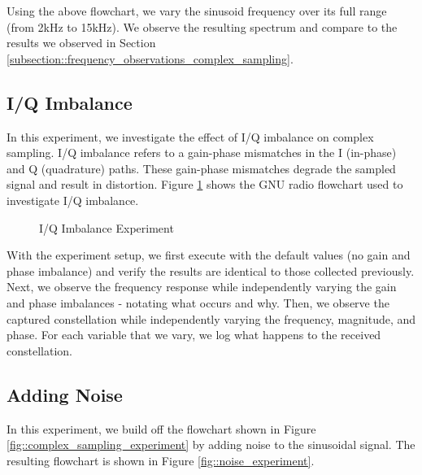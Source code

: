 \documentclass{article}
\begin{document}
Using the above flowchart, we vary the sinusoid frequency over its full range (from 2kHz to 15kHz). We observe the resulting spectrum and compare to the results we observed in Section \ref{subsection::frequency_observations_complex_sampling}.

\subsection{I/Q Imbalance}

In this experiment, we investigate the effect of I/Q imbalance on complex sampling. I/Q imbalance refers to a gain-phase mismatches in the I (in-phase) and Q (quadrature) paths. These gain-phase mismatches degrade the sampled signal and result in distortion. Figure \ref{fig::iq_imbalance_experiment} shows the GNU radio flowchart used to investigate I/Q imbalance.

\begin{figure}[H]
	\centerline{}
	\caption{I/Q Imbalance Experiment}
	\label{fig::iq_imbalance_experiment}
\end{figure}

With the experiment setup, we first execute with the default values (no gain and phase imbalance) and verify the results are identical to those collected previously. Next, we observe the frequency response while independently varying the gain and phase imbalances - notating what occurs and why. Then, we observe the captured constellation while independently varying the frequency, magnitude, and phase. For each variable that we vary, we log what happens to the received constellation.  

\subsection{Adding Noise}

In this experiment, we build off the flowchart shown in Figure \ref{fig::complex_sampling_experiment} by adding noise to the sinusoidal signal. The resulting flowchart is shown in Figure \ref{fig::noise_experiment}.
\end{document}
